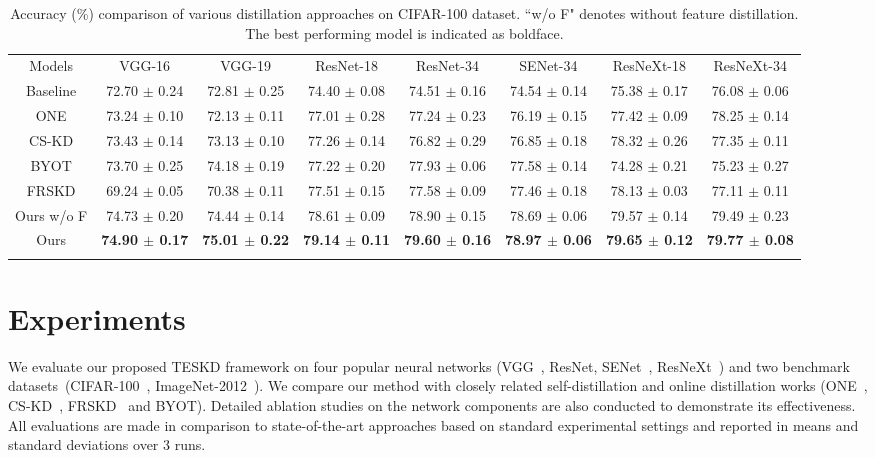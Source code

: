 \documentclass[letterpaper]{article} %
\begin{document}
\begin{table*}[t]
	\begin{center}
		\begin{tabular}{c|ccccccc}
			\hline\noalign{\smallskip}
			Models & VGG-16  & VGG-19	& ResNet-18 & ResNet-34 & SENet-34 & ResNeXt-18 & ResNeXt-34 \\
			\noalign{\smallskip}
			\hline
			\noalign{\smallskip}
			Baseline& 72.70 $\pm$ 0.24 	& 72.81 $\pm$ 0.25	& 74.40 $\pm$ 0.08	& 74.51 $\pm$ 0.16	& 74.54 $\pm$ 0.14	& 
			75.38 $\pm$ 0.17 & 76.08 $\pm$ 0.06	\\
			ONE	    & 73.24 $\pm$ 0.10	& 72.13 $\pm$ 0.11	& 77.01 $\pm$ 0.28	& 77.24 $\pm$ 0.23	& 76.19 $\pm$ 0.15	& 
			77.42 $\pm$ 0.09 & 78.25 $\pm$ 0.14	\\
			CS-KD   & 73.43 $\pm$ 0.14	& 73.13 $\pm$ 0.10	& 77.26 $\pm$ 0.14	& 76.82 $\pm$ 0.29	& 76.85 $\pm$ 0.18	&
			78.32 $\pm$ 0.26 & 77.35 $\pm$ 0.11	\\
			BYOT 	& 73.70 $\pm$ 0.25  & 74.18 $\pm$ 0.19	& 77.22 $\pm$ 0.20 	& 77.93 $\pm$ 0.06  & 77.58 $\pm$ 0.14	& 
			74.28 $\pm$ 0.21 & 75.23 $\pm$ 0.27	\\
			FRSKD   & 69.24 $\pm$ 0.05	& 70.38 $\pm$ 0.11	& 77.51 $\pm$ 0.15	& 77.58 $\pm$ 0.09 	& 77.46 $\pm$ 0.18	& 
			78.13 $\pm$ 0.03 & 77.11 $\pm$ 0.11	\\
			\noalign{\smallskip}
			\hline
			\noalign{\smallskip}
			Ours w/o F &	74.73 $\pm$ 0.20		  &	74.44 $\pm$ 0.14		  & 78.61 $\pm$ 0.09		  &	78.90 $\pm$ 0.15
			& 	78.69 $\pm$ 0.06	  &	79.57 $\pm$ 0.14		  &	79.49 $\pm$ 0.23\\
			Ours  				  & \textbf{74.90 $\pm$ 0.17} &	\textbf{75.01 $\pm$ 0.22} & \textbf{79.14 $\pm$ 0.11} & \textbf{79.60 $\pm$ 0.16} & \textbf{78.97 $\pm$ 0.06} & \textbf{79.65 $\pm$ 0.12} & \textbf{79.77 $\pm$ 0.08} \\
			\noalign{\smallskip}
			\hline
		\end{tabular}
		\caption{
			Accuracy (\%) comparison of various distillation approaches on CIFAR-100 dataset. ``w/o F" denotes without feature distillation. The best performing model is indicated as boldface. 
		}
		\label{table:cifar100}
	\end{center}
\end{table*}


\section{Experiments}

We evaluate our proposed TESKD framework on four popular neural networks (VGG~\cite{simonyan2014very}, ResNet, SENet~\cite{hu2018squeeze}, ResNeXt~\cite{xie2017aggregated}) and two benchmark datasets~(CIFAR-100~\cite{krizhevsky2009learning}, ImageNet-2012~\cite{deng2009imagenet}). We compare our method with closely related self-distillation and online distillation works (ONE~\cite{zhu2018knowledge}, CS-KD~\cite{yun2020regularizing}, FRSKD~\cite{ji2021refine} and BYOT). Detailed ablation studies on the network components are also conducted to demonstrate its effectiveness. All evaluations are made in comparison to state-of-the-art approaches based on standard experimental settings and reported in means and standard deviations over 3 runs.
\end{document}
